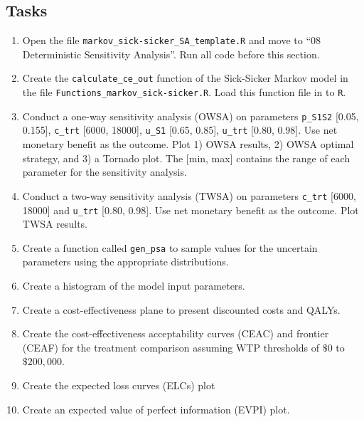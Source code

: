 \documentclass[
]{article}
\begin{document}
\hypertarget{tasks}{%
\subsection{Tasks}\label{tasks}}

\begin{enumerate}
\def\labelenumi{\arabic{enumi}.}
\item
  Open the file \texttt{markov\_sick-sicker\_SA\_template.R} and move to
  ``08 Deterministic Sensitivity Analysis''. Run all code before this
  section.
\item
  Create the \texttt{calculate\_ce\_out} function of the Sick-Sicker
  Markov model in the file \texttt{Functions\_markov\_sick-sicker.R}.
  Load this function file in to \texttt{R}.
\item
  Conduct a one-way sensitivity analysis (OWSA) on parameters
  \texttt{p\_S1S2} {[}0.05, 0.155{]}, \texttt{c\_trt} {[}6000, 18000{]},
  \texttt{u\_S1} {[}0.65, 0.85{]}, \texttt{u\_trt} {[}0.80, 0.98{]}. Use
  net monetary benefit as the outcome. Plot 1) OWSA results, 2) OWSA
  optimal strategy, and 3) a Tornado plot. The {[}min, max{]} contains
  the range of each parameter for the sensitivity analysis.
\item
  Conduct a two-way sensitivity analysis (TWSA) on parameters
  \texttt{c\_trt} {[}6000, 18000{]} and \texttt{u\_trt} {[}0.80,
  0.98{]}. Use net monetary benefit as the outcome. Plot TWSA results.
\item
  Create a function called \texttt{gen\_psa} to sample values for the
  uncertain parameters using the appropriate distributions.
\item
  Create a histogram of the model input parameters.
\item
  Create a cost-effectiveness plane to present discounted costs and
  QALYs.
\item
  Create the cost-effectiveness acceptability curves (CEAC) and frontier
  (CEAF) for the treatment comparison assuming WTP thresholds of \(\$0\)
  to \(\$200,000\).
\item
  Create the expected loss curves (ELCs) plot
\item
  Create an expected value of perfect information (EVPI) plot.
\end{enumerate}
\end{document}

